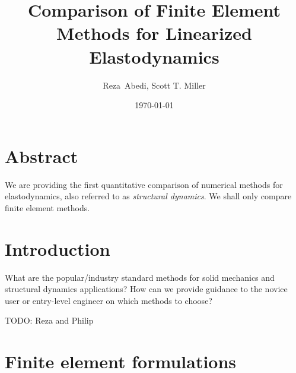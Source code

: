 \documentclass[12pt]{article}
\begin{document}
\title{Comparison of Finite Element Methods for Linearized Elastodynamics}
\author{Reza~Abedi, Scott T. Miller}
\date{\today}%
\maketitle

\section*{Abstract}
We are providing the first quantitative comparison of numerical
methods for elastodynamics, also referred to as \emph{structural dynamics}.
We shall only compare finite element methods.  

\section{Introduction}

What are the popular/industry standard methods for solid mechanics
and structural dynamics applications?  How can we provide guidance
to the novice user or entry-level engineer on which methods to 
choose?

TODO:  Reza and Philip

\section{Finite element formulations}
\end{document}
